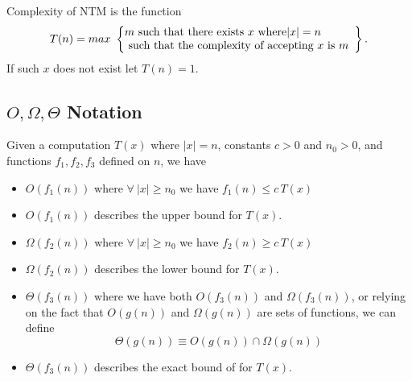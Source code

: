 \begin{definition}
    Complexity of NTM is the function
    \begin{equation}
        T(n) = max\ \left\{
            \begin{array}{@{}ll@{}}
                m \textrm{ such that there exists }x\textrm{ where} |x| = n\\
                \textrm{ such that the complexity of accepting }x\textrm{ is }m
            \end{array}\right\}.
    \end{equation}
    If such $x$ does not exist let $T(n) = 1$.
\end{definition}

\subsection{$O, \Omega, \Theta$ Notation}
\begin{definition}
    Given a computation $T(x)$ where $|x| = n$,
    constants $c > 0$ and $n_0 > 0$,
    and functions $f_1, f_2, f_3$ defined on $n$,
    we have
    \begin{itemize}
        \item $O(f_1(n))$ where $\forall\ |x| \geq n_0$ we have $f_1(n) \leq c\,T(x)$
        \item $O(f_1(n))$ describes the upper bound for $T(x)$.
        \item $\Omega(f_2(n))$ where $\forall\ |x| \geq n_0$ we have $f_2(n) \geq c\,T(x)$
        \item $\Omega(f_2(n))$ describes the lower bound for $T(x)$.
        \item $\Theta(f_3(n))$ where we have both $O(f_3(n))$ and $\Omega(f_3(n))$,
            or relying on the fact that $O(g(n))$ and $\Omega(g(n))$ are sets of functions, we can define
            $$\Theta(g(n)) \equiv O(g(n)) \cap \Omega(g(n))$$
        \item $\Theta(f_3(n))$ describes the exact bound of for $T(x)$.

    \end{itemize}
\end{definition}
